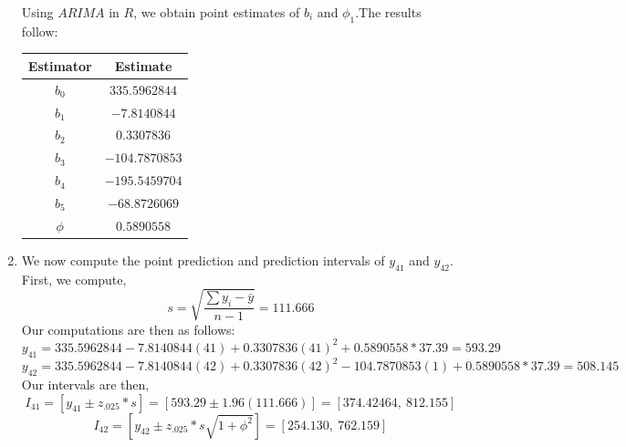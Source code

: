 \documentclass[letterpaper,10pt]{article}
\begin{document}
\begin{enumerate}
Using $ARIMA$ in $R$, we obtain point estimates of $b_i$ and $\phi_1$.The results follow:
\begin{center}
\begin{tabular}{|c|c|}
\hline
Estimator & Estimate\\\hline
$b_0$ & $335.5962844$\\
$b_1$ & $-7.8140844$\\
$b_2$ & $0.3307836$\\
$b_3$ & $-104.7870853$\\
$b_4$ & $-195.5459704$\\
$b_5$ & $-68.8726069$\\
$\phi$ & $0.5890558$ \\\hline
\end{tabular}
\end{center}
\item We now compute the point prediction and prediction intervals of $y_{41}$ and $y_{42}$. First, we compute,
\[s=\sqrt{\frac{\sum y_i-\bar{y}}{n-1}}=111.666\]
Our computations are then as follows:
\[y_{41}=335.5962844-7.8140844(41)+0.3307836(41)^2+0.5890558*37.39=593.29\]
\[y_{42}=335.5962844-7.8140844(42)+0.3307836(42)^2-104.7870853(1)+0.5890558*37.39=508.145\]
Our intervals are then,
\[I_{41}=[y_{41}\pm z_{.025}*s]=[593.29\pm 1.96(111.666)]=[374.42464,\ 812.155]\]
\[I_{42}=[y_{42}\pm z_{.025}*s\sqrt{1+\phi^2}]=[254.130,\ 762.159]\]
\end{enumerate}
\end{document}
